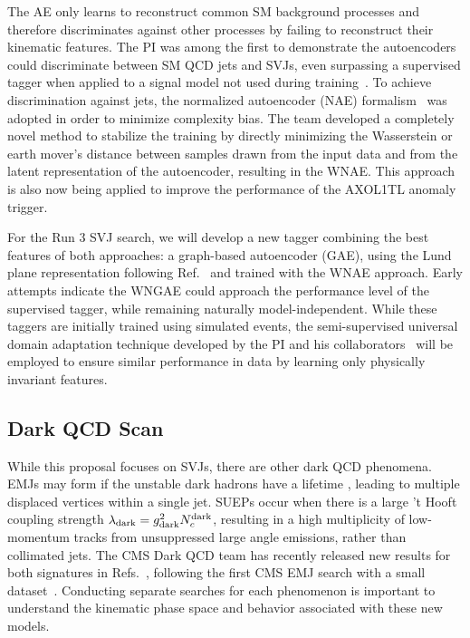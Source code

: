 The AE only learns to reconstruct common SM background processes and therefore discriminates against other processes by failing to reconstruct their kinematic features.
The PI was among the first to demonstrate the autoencoders could discriminate between SM QCD jets and SVJs, even surpassing a supervised tagger when applied to a signal model not used during training~\cite{Canelli:2021aps}.
To achieve discrimination against \ttbar jets, the normalized autoencoder (NAE) formalism~\cite{Dillon:2022mkq} was adopted in order to minimize complexity bias.
The team developed a completely novel method to stabilize the training by directly minimizing the Wasserstein or earth mover's distance
between samples drawn from the input data and from the latent representation of the autoencoder, resulting in the WNAE.
This approach is also now being applied to improve the performance of the AXOL1TL anomaly trigger.

For the Run 3 SVJ search, we will develop a new tagger combining the best features of both approaches:
a graph-based autoencoder (GAE), using the Lund plane representation following Ref.~\cite{Dreyer:2020brq} and trained with the WNAE approach.
Early attempts indicate the WNGAE could approach the performance level of the supervised tagger, while remaining naturally model-independent.
While these taggers are initially trained using simulated events,
the semi-supervised universal domain adaptation technique developed by the PI and his collaborators~\cite{Ciprijanovic:2023hrw}
will be employed to ensure similar performance in data by learning only physically invariant features.

\subsection{Dark QCD Scan}\label{subsec:darkscan}

While this proposal focuses on SVJs, there are other dark QCD phenomena.
EMJs may form if the unstable dark hadrons have a lifetime \taudark, leading to multiple displaced vertices within a single jet.
SUEPs occur when there is a large 't Hooft coupling strength $\lambda_\text{dark} = g_{\mathrm{dark}}^2 N_{c}^{\text{dark}}$,
resulting in a high multiplicity of low-momentum tracks from unsuppressed large angle emissions, rather than collimated jets.
The CMS Dark QCD team has recently released new results for both signatures in Refs.~\cite{CMS:2023vpb,CMS:2024emj},
following the first CMS EMJ search with a small dataset~\cite{Sirunyan:2018njd}.
Conducting separate searches for each phenomenon is important to understand the kinematic phase space and behavior associated with these new models.

